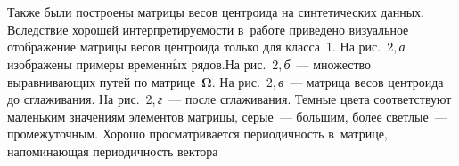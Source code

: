 \begin{multicols}{2}
\begin{figure*}%
\vspace*{1pt}
 \begin{center}
 \mbox{%
 \epsfxsize=151.698mm
 }
 \end{center}
 \vspace*{-9pt}
\vspace*{1pt}
 \begin{center}
 \mbox{%
 \epsfxsize=152.753mm
 }
 \end{center}
 \vspace*{-9pt}
\end{figure*}

Также были построены матрицы весов центроида на синтетических данных. 
Вследствие хорошей интерпретируемости в~работе приведено визуальное отображение 
матрицы весов центроида только для класса~1. На рис.~2,\,\textit{а} изображены примеры 
временн$\acute{\mbox{ы}}$х рядов.На рис.~2,\,\textit{б}~--- 
множество выравнивающих путей по 
матрице~$\boldsymbol{\Omega}$. На рис.~2,\,\textit{в}~--- матрица весов центроида 
до сглаживания. На рис.~2,\,\textit{г}~--- после сглаживания. 
Темные цвета соответствуют 
маленьким значениям элементов матрицы, серые~--- большим, более светлые~--- 
промежуточным. Хорошо просматривается периодичность в~матрице, напоминающая 
периодичность вектора\linebreak\vspace*{-12pt}

\begin{table*}[b]\small
\begin{center}


\vspace*{2ex}


\end{center}
\end{table*}
\end{multicols}
